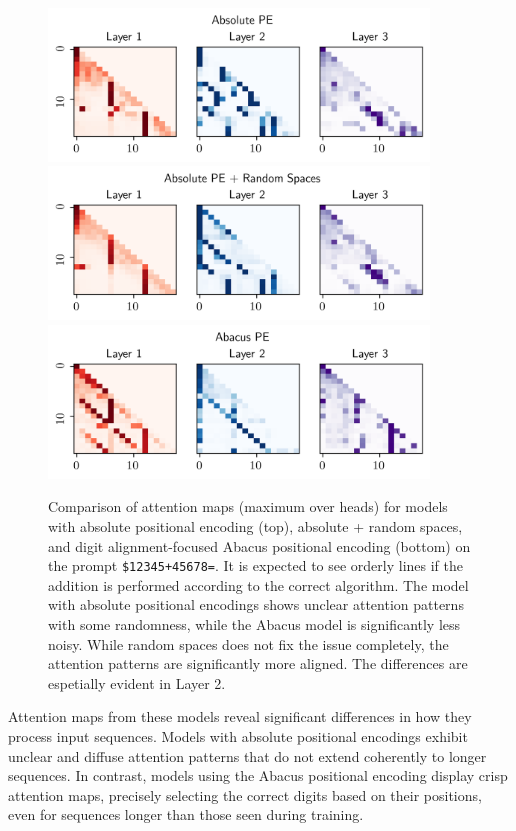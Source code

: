 \begin{figure}[h!]
    \centering
    \includegraphics[width=0.9\textwidth]{fig/attn_map_abs_pe.png}
    \includegraphics[width=0.9\textwidth]{fig/attn_map_abs_pe_random_spaces.png}
    \includegraphics[width=0.9\textwidth]{fig/attn_map_abacus_pe.png}
    \caption{Comparison of attention maps (maximum over heads) for models with absolute positional encoding (top), absolute + random spaces, and digit alignment-focused Abacus \parencite{mcleish_transformers_2024} positional encoding (bottom) on the prompt \texttt{\$12345+45678=}. It is expected to see orderly lines if the addition is performed according to the correct algorithm. The model with absolute positional encodings shows unclear attention patterns with some randomness, while the Abacus model is significantly less noisy. While random spaces does not fix the issue completely, the attention patterns are significantly more aligned. The differences are espetially evident in Layer 2.}
    \label{fig:digit_align_attn_maps}
\end{figure}

Attention maps from these models reveal significant differences in how they process input sequences. Models with absolute positional encodings exhibit unclear and diffuse attention patterns that do not extend coherently to longer sequences. In contrast, models using the Abacus positional encoding display crisp attention maps, precisely selecting the correct digits based on their positions, even for sequences longer than those seen during training.

